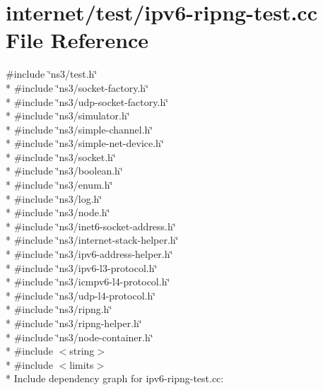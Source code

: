 \hypertarget{ipv6-ripng-test_8cc}{}\section{internet/test/ipv6-\/ripng-\/test.cc File Reference}
\label{ipv6-ripng-test_8cc}
{\ttfamily \#include \char`\"{}ns3/test.\+h\char`\"{}}\\*
{\ttfamily \#include \char`\"{}ns3/socket-\/factory.\+h\char`\"{}}\\*
{\ttfamily \#include \char`\"{}ns3/udp-\/socket-\/factory.\+h\char`\"{}}\\*
{\ttfamily \#include \char`\"{}ns3/simulator.\+h\char`\"{}}\\*
{\ttfamily \#include \char`\"{}ns3/simple-\/channel.\+h\char`\"{}}\\*
{\ttfamily \#include \char`\"{}ns3/simple-\/net-\/device.\+h\char`\"{}}\\*
{\ttfamily \#include \char`\"{}ns3/socket.\+h\char`\"{}}\\*
{\ttfamily \#include \char`\"{}ns3/boolean.\+h\char`\"{}}\\*
{\ttfamily \#include \char`\"{}ns3/enum.\+h\char`\"{}}\\*
{\ttfamily \#include \char`\"{}ns3/log.\+h\char`\"{}}\\*
{\ttfamily \#include \char`\"{}ns3/node.\+h\char`\"{}}\\*
{\ttfamily \#include \char`\"{}ns3/inet6-\/socket-\/address.\+h\char`\"{}}\\*
{\ttfamily \#include \char`\"{}ns3/internet-\/stack-\/helper.\+h\char`\"{}}\\*
{\ttfamily \#include \char`\"{}ns3/ipv6-\/address-\/helper.\+h\char`\"{}}\\*
{\ttfamily \#include \char`\"{}ns3/ipv6-\/l3-\/protocol.\+h\char`\"{}}\\*
{\ttfamily \#include \char`\"{}ns3/icmpv6-\/l4-\/protocol.\+h\char`\"{}}\\*
{\ttfamily \#include \char`\"{}ns3/udp-\/l4-\/protocol.\+h\char`\"{}}\\*
{\ttfamily \#include \char`\"{}ns3/ripng.\+h\char`\"{}}\\*
{\ttfamily \#include \char`\"{}ns3/ripng-\/helper.\+h\char`\"{}}\\*
{\ttfamily \#include \char`\"{}ns3/node-\/container.\+h\char`\"{}}\\*
{\ttfamily \#include $<$string$>$}\\*
{\ttfamily \#include $<$limits$>$}\\*
Include dependency graph for ipv6-\/ripng-\/test.cc\+:
